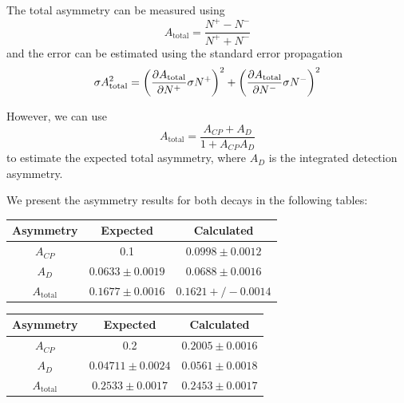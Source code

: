\documentclass{article}
\begin{document}
    The total asymmetry can be measured using
    \begin{equation}
        A_{\text{total}} = \frac{N^+ - N^-}{N^+ + N^-}
    \end{equation}
    and the error can be estimated using the standard error propagation
    \begin{equation}
        \sigma A_{\text{total}} ^2 = \left(\pdv{A_{\text{total}}}{N^+}\sigma N^+\right)^2 + \left(\pdv{A_{\text{total}}}{N^-}\sigma N^-\right)^2
    \end{equation}

    However, we can use 
    \begin{equation}
        A_{\text{total}} = \frac{A_{CP} + A_D}{1 + A_{CP}A_D}
    \end{equation}
    to estimate the expected total asymmetry, where $A_{D}$ is the integrated detection asymmetry.

    We present the asymmetry results for both decays in the following tables:
    \begin{center}
        \begin{tabular}{c|c|c}
            Asymmetry & Expected & Calculated\\
            \hline\hline
            $A_{CP}$ & 0.1 & $0.0998\pm0.0012$\\
            $A_{D}$ & $0.0633\pm0.0019$ & $0.0688\pm0.0016$\\
            $A_{\text{total}}$ & $0.1677\pm0.0016$ & $0.1621 +/- 0.0014$\\
        \end{tabular}
    \end{center}

    \begin{center}
        \begin{tabular}{c|c|c}
            Asymmetry & Expected & Calculated\\
            \hline\hline
            $A_{CP}$ & 0.2 & $0.2005\pm0.0016$\\
            $A_{D}$ & $0.04711\pm0.0024$ & $0.0561\pm0.0018$\\
            $A_{\text{total}}$ & $0.2533\pm0.0017$ & $0.2453\pm0.0017$\\
        \end{tabular}
    \end{center}
    
\end{document}
